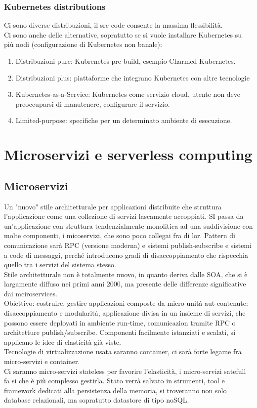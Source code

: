 \documentclass[16px]{article}
\begin{document}
\subsubsection{Kubernetes distributions}
Ci sono diverse distribuzioni, il src code consente la massima flessibilità.\\ Ci sono anche delle alternative, sopratutto se si vuole installare Kubernetes su più nodi (configurazione di Kubernetes non banale):
\begin{enumerate}
\item Distribuzioni pure: Kubrenetes pre-build, esempio Charmed Kubernetes.
\item Distribuzioni plus: piattaforme che integrano Kubernetes con altre tecnologie 
\item Kubernetes-as-a-Service: Kubernetes come servizio cloud, utente non deve preoccuparsi di manutenere, configurare il servizio.
\item Limited-purpose: specifiche per un determinato ambiente di esecuzione.
\end{enumerate}
\section{Microservizi e serverless computing}
\subsection{Microservizi}
Un "nuovo" stile architetturale per applicazioni distribuite che struttura l'applicazione come una collezione di servizi lascamente accoppiati. SI passa da un'applicazione con struttura tendenzialmente monolitica ad una suddivisione con molte componenti, i micoservizi, che sono poco collegai fra di lor. Pattern di comunicazione sarà RPC (versione moderna) e sistemi publish-subscribe e sistemi a code di messaggi, perché introducono gradi di disaccoppiamento che rispecchia quello tra i servizi del sistema stesso.\\ Stile architetturale non è totalmente nuovo, in quanto deriva dalle SOA, che si è largamente diffuso nei primi anni 2000, ma presente delle differenze significative dai mciroservices.\\ Obiettivo: costruire, gestire applicazioni composte da micro-unità aut-contenute: disaccoppiamento e modularità, applicazione divisa in un insieme di servizi, che possono essere deployati in ambiente run-time, comunicazion tramite RPC o architetture publish/subscribe. Componenti facilmente istanziati e scalati, si applicano le idee di elasticità già viste.\\ Tecnologie di virtualizzazione usata saranno container, ci sarà forte legame fra micro-servizi e container.\\ Ci saranno micro-servizi stateless per favorire l'elasticità, i micro-servizi satefull fa si che è più complesso gestirla. Stato verrà salvato in strumenti, tool e framework dedicati alla persistenza della memoria, si troveranno non solo database relazionali, ma sopratutto datastore di tipo noSQL.\\ 
\end{document}
